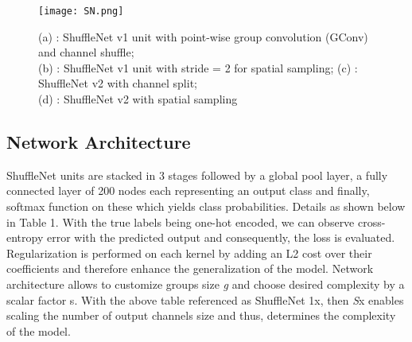 \documentclass{article}
\begin{document}
\begin{figure}[H]
    \centering
    \texttt{[image: SN.png]}
    \caption{(a) : ShuffleNet v1 unit with point-wise group convolution (GConv) and channel shuffle; \\ (b) : ShuffleNet v1 unit with stride = 2 for spatial sampling; (c) : ShuffleNet v2 with channel split; \\ (d) : ShuffleNet v2 with spatial sampling} %
\end{figure}

\subsection{Network Architecture}
ShuffleNet units are stacked in 3 stages followed by a global pool layer, a fully connected layer of 200 nodes each representing an output class and finally, softmax function on these which yields class probabilities. Details as shown below in Table 1. With the true labels being one-hot encoded, we can observe cross-entropy error with the predicted output and consequently, the loss is evaluated. Regularization is performed on each kernel by adding an L2 cost over their coefficients and therefore enhance the generalization of the model. 
Network architecture allows to customize groups size \textit{g} and choose desired complexity by a scalar factor s. With the above table referenced as ShuffleNet 1x, then \textit{S}x enables scaling the number of output channels size and thus, determines the complexity of the model.
\end{document}
